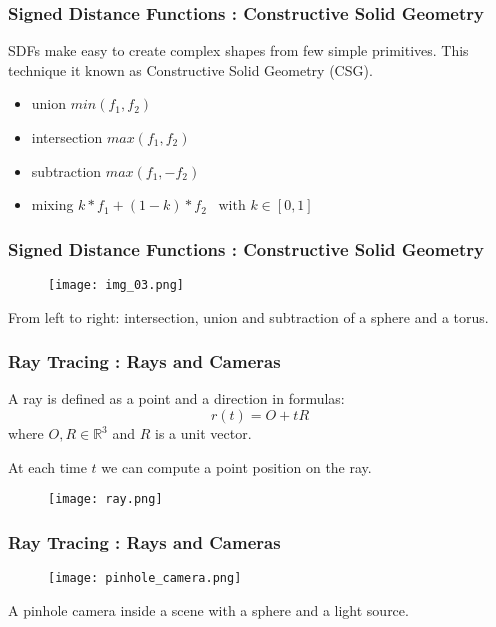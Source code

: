 \documentclass{beamer}
\newcommand\R{\ensuremath{\mathbb{R}}}
\begin{document}
\begin{frame}
\frametitle{Signed Distance Functions : Constructive Solid Geometry}
SDFs make easy to create complex shapes from few simple primitives.
This technique it known as Constructive Solid Geometry (CSG).
\begin{itemize}
  \item union $ min(f_1, f_2) $
  \item intersection $ max(f_1, f_2) $
  \item subtraction $ max(f_1, -f_2) $
  \item mixing $ k*f_1 + (1-k) * f_2 \;\;\; \text{with $k\in[0,1]$} $
\end{itemize}
\end{frame}



\begin{frame}
\frametitle{Signed Distance Functions : Constructive Solid Geometry}
\begin{figure}[!htb]
  \centering
  \texttt{[image: img\_03.png]}
\end{figure}
From left to right:
intersection, union and subtraction of a sphere and a torus.
\end{frame}


\begin{frame}
\frametitle{Ray Tracing : Rays and Cameras}

A ray is defined as a point and a direction in formulas:
$$
r(t) = O + tR
$$
where $O,R \in \R^3$ and $R$ is a unit vector.

At each time $t$ we can compute a point position on the ray.
\begin{figure}[!htb]
  \centering
  \texttt{[image: ray.png]}
\end{figure}
\end{frame}


\begin{frame}
\frametitle{Ray Tracing : Rays and Cameras}
\begin{figure}[!htb]
  \centering
  \texttt{[image: pinhole\_camera.png]}
\end{figure}
A pinhole camera inside a scene with a sphere and a light source.
\end{frame}
\end{document}
